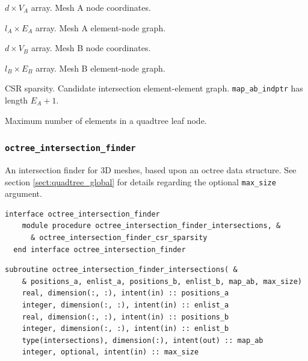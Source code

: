\documentclass{article}
\begin{document}
\begin{description}[font=\ttfamily\bfseries,leftmargin=2.2\parindent,labelindent=1.7\parindent,noitemsep]
  \item[positions\_a] $d \times V_A$ array. Mesh A node coordinates.
  \item[enlist\_a] $l_A \times E_A$ array. Mesh A element-node graph.
  \item[positions\_b] $d \times V_B$ array. Mesh B node coordinates.
  \item[enlist\_b] $l_B \times E_B$ array. Mesh B element-node graph.
  \item[map\_ab\_indices, map\_ab\_indptr] CSR sparsity. Candidate intersection
    element-element graph. \linebreak \verb+map_ab_indptr+ has length $E_A + 1$.
  \item[max\_size] Maximum number of elements in a quadtree leaf node.
\end{description}

\subsubsection{\texttt{octree\_intersection\_finder}}\label{sect:octree_global}

An intersection finder for 3D meshes, based upon an octree data structure. See
section \ref{sect:quadtree_global} for details regarding the optional
\verb+max_size+ argument.

\begin{lstlisting}[language=FORTRAN]  
  interface octree_intersection_finder
    module procedure octree_intersection_finder_intersections, &
      & octree_intersection_finder_csr_sparsity
  end interface octree_intersection_finder
\end{lstlisting}

\begin{lstlisting}[language=FORTRAN]
  subroutine octree_intersection_finder_intersections( &
    & positions_a, enlist_a, positions_b, enlist_b, map_ab, max_size)
    real, dimension(:, :), intent(in) :: positions_a
    integer, dimension(:, :), intent(in) :: enlist_a
    real, dimension(:, :), intent(in) :: positions_b
    integer, dimension(:, :), intent(in) :: enlist_b
    type(intersections), dimension(:), intent(out) :: map_ab
    integer, optional, intent(in) :: max_size
\end{lstlisting}
\end{document}
